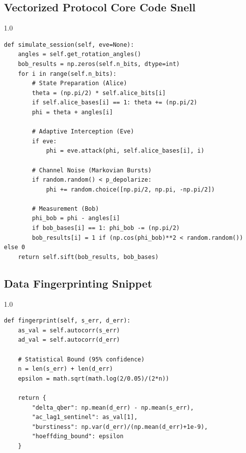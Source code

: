 \documentclass[journal,onecolumn,12pt,draftclsnofoot]{IEEEtran}
\begin{document}
\subsection{Vectorized Protocol Core Code Snell}
\begin{spacing}{1.0}
\begin{verbatim}
def simulate_session(self, eve=None):
    angles = self.get_rotation_angles()
    bob_results = np.zeros(self.n_bits, dtype=int)
    for i in range(self.n_bits):
        # State Preparation (Alice)
        theta = (np.pi/2) * self.alice_bits[i]
        if self.alice_bases[i] == 1: theta += (np.pi/2)
        phi = theta + angles[i]
        
        # Adaptive Interception (Eve)
        if eve:
            phi = eve.attack(phi, self.alice_bases[i], i)
        
        # Channel Noise (Markovian Bursts)
        if random.random() < p_depolarize:
            phi += random.choice([np.pi/2, np.pi, -np.pi/2])
        
        # Measurement (Bob)
        phi_bob = phi - angles[i]
        if bob_bases[i] == 1: phi_bob -= (np.pi/2)
        bob_results[i] = 1 if (np.cos(phi_bob)**2 < random.random()) else 0
    return self.sift(bob_results, bob_bases)
\end{verbatim}
\end{spacing}

\subsection{Data Fingerprinting Snippet}
\begin{spacing}{1.0}
\begin{verbatim}
def fingerprint(self, s_err, d_err):
    as_val = self.autocorr(s_err)
    ad_val = self.autocorr(d_err)
    
    # Statistical Bound (95% confidence)
    n = len(s_err) + len(d_err)
    epsilon = math.sqrt(math.log(2/0.05)/(2*n))
    
    return {
        "delta_qber": np.mean(d_err) - np.mean(s_err),
        "ac_lag1_sentinel": as_val[1],
        "burstiness": np.var(d_err)/(np.mean(d_err)+1e-9),
        "hoeffding_bound": epsilon
    }
\end{verbatim}
\end{spacing}
\end{document}
